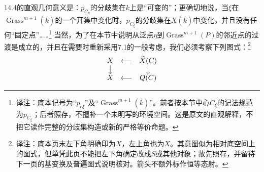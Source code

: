 \documentclass[openany,fontset=fandol]{ctexbook}
\newcommand{\note}[1]{\unskip\nobreak\footnote{译注：#1}}
\begin{document}
\newpage
14.4的直观几何意义是：$p_{C_\eta}$的分歧集在$k$上是“可变的”；更确切地说，当$\xi$在$\operatorname{Grass}^{m+1}(\bar k)$的一个开集中变化时，$p_{C_\xi}$的分歧集在$X(\bar k)$中变化，并且没有任何“固定点”……\note{底本记号为“$p_{c\xi}$”及“$\operatorname{Grass}^{m+1}(\bar k)$”。前者按本节中心$C_\xi$的记法规范为$p_{C_\xi}$；后者照存，不擅补一个未明写的环境空间。这是原文的直观解释，不把它读作完整的分歧集构造或新的严格等价命题。}
当然，为了在本节中说明从泛点$\eta$到$\operatorname{Grass}^{m+1}(P)$的邻近点的过渡是成立的，并且在需要时重新采用7.1的一般考虑，我们必须考察下列图式：\note{底本页末左下角明确印为$X$，左上角也为$X$。其意图似为相对底空间上的图式，但单凭此页不能把左下角确定改成$S$或其他对象；故先照存，并留待下一页的基变换及普遍图式说明核对。箭头不额外标作恒等态射。}
\[
\begin{array}{ccc}
X&\longleftarrow&\widetilde X(C)\\
\big\downarrow&&\big\downarrow\\
X&\longleftarrow&Q(C)
\end{array}
\]
\end{document}
